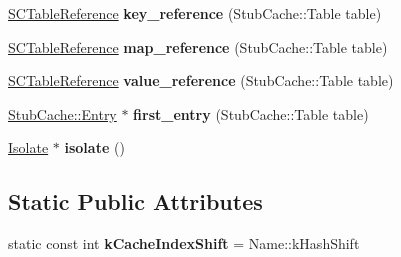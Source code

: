 \begin{DoxyCompactItemize}
\item 
\hypertarget{classv8_1_1internal_1_1_stub_cache_a575962f2abed80344525523caea0f6ff}{}\hyperlink{classv8_1_1internal_1_1_s_c_table_reference}{S\+C\+Table\+Reference} {\bfseries key\+\_\+reference} (Stub\+Cache\+::\+Table table)\label{classv8_1_1internal_1_1_stub_cache_a575962f2abed80344525523caea0f6ff}

\item 
\hypertarget{classv8_1_1internal_1_1_stub_cache_a5fafa8f381e563ececf1822dc4115660}{}\hyperlink{classv8_1_1internal_1_1_s_c_table_reference}{S\+C\+Table\+Reference} {\bfseries map\+\_\+reference} (Stub\+Cache\+::\+Table table)\label{classv8_1_1internal_1_1_stub_cache_a5fafa8f381e563ececf1822dc4115660}

\item 
\hypertarget{classv8_1_1internal_1_1_stub_cache_a24b58a5748ec9e5daddb55777e945319}{}\hyperlink{classv8_1_1internal_1_1_s_c_table_reference}{S\+C\+Table\+Reference} {\bfseries value\+\_\+reference} (Stub\+Cache\+::\+Table table)\label{classv8_1_1internal_1_1_stub_cache_a24b58a5748ec9e5daddb55777e945319}

\item 
\hypertarget{classv8_1_1internal_1_1_stub_cache_aab4c138ee8789856c0a67058107a9c58}{}\hyperlink{structv8_1_1internal_1_1_stub_cache_1_1_entry}{Stub\+Cache\+::\+Entry} $\ast$ {\bfseries first\+\_\+entry} (Stub\+Cache\+::\+Table table)\label{classv8_1_1internal_1_1_stub_cache_aab4c138ee8789856c0a67058107a9c58}

\item 
\hypertarget{classv8_1_1internal_1_1_stub_cache_a09849599e472fa634b681bc3c2aef9af}{}\hyperlink{classv8_1_1internal_1_1_isolate}{Isolate} $\ast$ {\bfseries isolate} ()\label{classv8_1_1internal_1_1_stub_cache_a09849599e472fa634b681bc3c2aef9af}

\end{DoxyCompactItemize}
\subsection*{Static Public Attributes}
\begin{DoxyCompactItemize}
\item 
\hypertarget{classv8_1_1internal_1_1_stub_cache_a07d471a2ba3f66c34c0dce09cb11bee8}{}static const int {\bfseries k\+Cache\+Index\+Shift} = Name\+::k\+Hash\+Shift\label{classv8_1_1internal_1_1_stub_cache_a07d471a2ba3f66c34c0dce09cb11bee8}

\end{DoxyCompactItemize}
